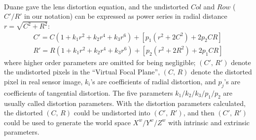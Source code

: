 \\\indent%
Duane \cite{distortion2_1966} gave the lens distortion equation, and the undistorted \(Col\) and \(Row\) (\(C'/R'\) in our notation) can be expressed as power series in radial distance \(r = \sqrt{C^2 + R^2}\):
%
\begin{equation}
\begin{aligned}
C' =  C (1 + k_1 r^2 + k_2 r^4 + k_3 r^6) + [p_1 (r^2 + 2 C^2) + 2 p_2 CR] %
\\
R' =  R (1 + k_1 r^2 + k_2 r^4 + k_3 r^6) + [p_2 (r^2 + 2 R^2) + 2 p_1 CR]
\end{aligned}
\label{lensDistortion}
\end{equation}%
%
\noindent
where higher order parameters are omitted for being negligible; \((C', \, R')\) denote the undistorted pixels in the \enquote{Virtual Focal Plane}, \((C, \, R)\) denote the distorted pixel in real sensor image, \(k_i\)'s are coefficients of radial distortion, and \(p_j\)'s are coefficients of tangential distortion. The five parameters \(k_1/k_2/k_3/p_1/p_2\) are usually called distortion parameters. With the distortion parameters calculated, the distorted \((C, \, R)\) could be undistorted into \((C', \, R')\), and then \((C', \, R')\) could be used to generate the world space \(X^w/Y^w/Z^w\) with intrinsic and extrinsic parameters.
%


